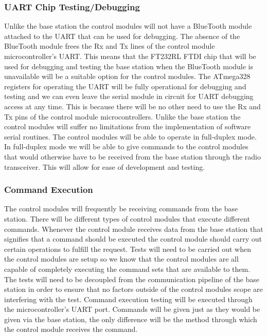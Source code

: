 \subsubsection{UART Chip Testing/Debugging}
Unlike the base station the control modules will not have a BlueTooth module
attached to the UART that can be used for debugging. The absence of the
BlueTooth module frees the Rx and Tx lines of the control module
microcontroller{}'s UART. This means that the FT232RL FTDI chip that will be
used for debugging and testing the base station when the BlueTooth module is
unavailable will be a suitable option for the control modules. The ATmega328
registers for operating the UART will be fully operational for debugging and
testing and we can even leave the serial module in circuit for UART debugging
access at any time. This is because there will be no other need to use the Rx
and Tx pins of the control module microcontrollers. Unlike the base station the
control modules will suffer no limitations from the implementation of software
serial routines. The control modules will be able to operate in full{}-duplex
mode. In full{}-duplex mode we will be able to give commands to the control
modules that would otherwise have to be received from the base station through
the radio transceiver. This will allow for ease of development and testing.

\subsubsection{Command Execution}

The control modules will frequently be receiving commands from the base
station. There will be different types of control modules that execute
different commands. Whenever the control module receives data from the base
station that signifies that a command should be executed the control module
should carry out certain operations to fulfill the request. Tests will need to
be carried out when the control modules are setup so we know that the control
modules are all capable of completely executing the command sets that are
available to them. The tests will need to be decoupled from the communication
pipeline of the base station in order to ensure that no factors outside of the
control modules scope are interfering with the test. Command execution testing
will be executed through the microcontroller{}'s UART port. Commands will be
given just as they would be given via the base station, the only difference
will be the method through which the control module receives the command.


